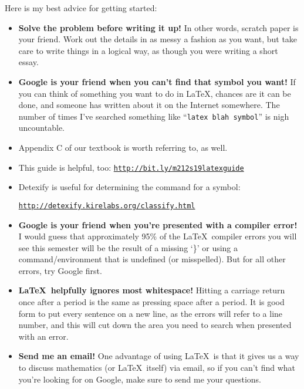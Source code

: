 \documentclass[11pt]{amsart}
\theoremstyle{plain}
\theoremstyle{definition}
\begin{document}
Here is my best advice for getting started:
\begin{itemize}\renewcommand{\labelitemi}{$\diamond$}
	\item \textbf{Solve the problem before writing it up!} In other words, scratch paper is your friend. Work out the details in as messy a fashion as you want, but take care to write things in a logical way, as though you were writing a short essay.
	\item \textbf{Google is your friend when you can't find that symbol you want!} If you can think of something you want to do in \LaTeX, chances are it can be done, and someone has written about it on the Internet somewhere.  The number of times I've searched something like ``{\tt latex blah symbol}'' is nigh uncountable.
	\item Appendix C of our textbook is worth referring to, as well.
	\item This guide is helpful, too: {\tt \href{http://bit.ly/m212s19latexguide}{http://bit.ly/m212s19latexguide}}
	\item Detexify is useful for determining the command for a symbol: 
	
	{\tt \href{http://detexify.kirelabs.org/classify.html}{http://detexify.kirelabs.org/classify.html}}
	\item \textbf{Google is your friend when you're presented with a compiler error!} I would guess that approximately 95\% of the \LaTeX\ compiler errors you will see this semester will be the result of a missing `\}' or using a command/environment that is undefined (or misspelled). But for all other errors, try Google first.
	\item \textbf{\LaTeX\ helpfully ignores most whitespace!} Hitting a carriage return once after a period is the same as pressing space after a period. It is good form to put every sentence on a new line, as the errors will refer to a line number, and this will cut down the area you need to search when presented with an error.
	\item \textbf{Send me an email!} One advantage of using \LaTeX\ is that it gives us a way to discuss mathematics (or \LaTeX\ itself) via email, so if you can't find what you're looking for on Google, make sure to send me your questions. 
\end{itemize}
\end{document}
